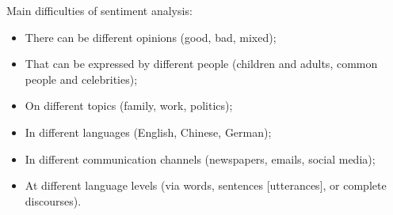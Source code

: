 \documentclass{beamer}
\begin{document}
\begin{frame}{}
  Main difficulties of sentiment analysis:
  \begin{itemize}\pause{}
  \item<+-> There can be different opinions (good, bad, mixed);
  \item<+-> That can be expressed by different people (children and
    adults, common people and celebrities);
  \item<+-> On different topics (family, work, politics);
  \item<+-> In different languages (English, Chinese, German);
  \item<+-> In different communication channels (newspapers, emails,
    social media);
  \item<+-> At different language levels (via words, sentences
    [utterances], or complete discourses).
  \end{itemize}
\end{frame}
\end{document}
